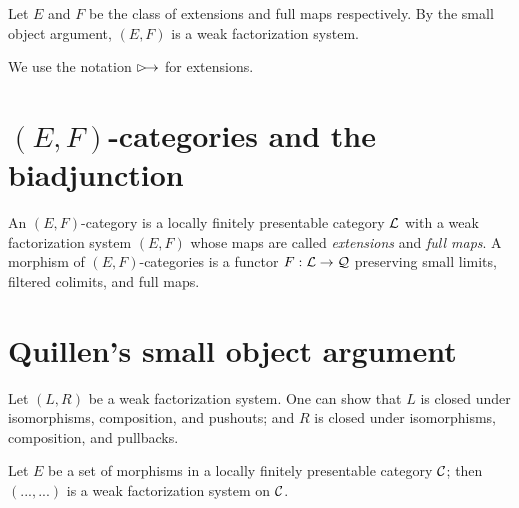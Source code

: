 \documentclass[a4paper]{article}
\begin{document}
\begin{remark}
  Let $E$ and $F$ be the class of extensions and full maps respectively.
  By the small object argument, $(E,F)$ is a weak factorization system.
\end{remark}

\begin{notation}
  We use the notation $\extension$ for extensions.
\end{notation}

\section{$(E,F)$-categories and the biadjunction}

\begin{definition}
  An $(E,F)$-category is a locally finitely presentable category $\mathcal{L}$ with a weak factorization system $(E,F)$ whose maps are called \emph{extensions} and \emph{full maps}.
  A morphism of $(E,F)$-categories is a functor $F : \mathcal{L} \to \mathcal{Q}$ preserving small limits, filtered colimits, and full maps.
\end{definition}

\section{Quillen's small object argument}

Let $(L,R)$ be a weak factorization system.
One can show that $L$ is closed under isomorphisms, composition, and pushouts; and $R$ is closed under isomorphisms, composition, and pullbacks.

\begin{theorem}
  Let $E$ be a set of morphisms in a locally finitely presentable category $\mathcal{C}$; then $(...,...)$ is a weak factorization system on $\mathcal{C}$.
\end{theorem}

\printbibliography
\end{document}
